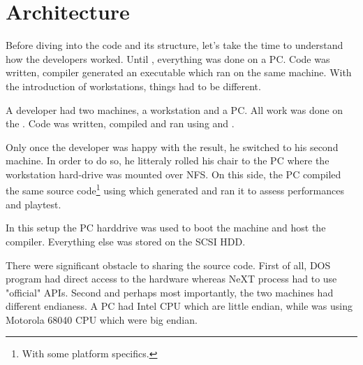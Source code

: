 \section{Architecture}
Before diving into the code and its structure, let's take the time to understand how the developers worked. Until \doom, everything was done on a PC. Code was written, compiler generated an executable which ran on the same machine. With the introduction of \NeXT workstations, things had to be different.\\
\par
A developer had two machines, a workstation and a PC. All work was done on the \NeXT. Code was written, compiled and ran using  and .\\
\par
Only once the developer was happy with the result, he switched to his second machine. In order to do so, he litteraly rolled his chair to the PC where the \NeXT workstation hard-drive was mounted over NFS. On this side, the PC compiled the same source code\footnote{With some platform specifics.} using  which generated  and ran it to assess performances and playtest.\\
\par
 In this setup the PC harddrive was used to boot the machine and host the compiler. Everything else was stored on the \NeXT SCSI HDD.\\
\par
There were significant obstacle to sharing the source code. First of all, DOS program had direct access to the hardware whereas NeXT process had to use "official" APIs. Second and perhaps most importantly, the two machines had different endianess. A PC had Intel CPU which are little endian, while \NeXT was using Motorola 68040 CPU which were big endian.\\
\par
\begin{figure}[H]
\centering
{}
\end{figure}
\par



